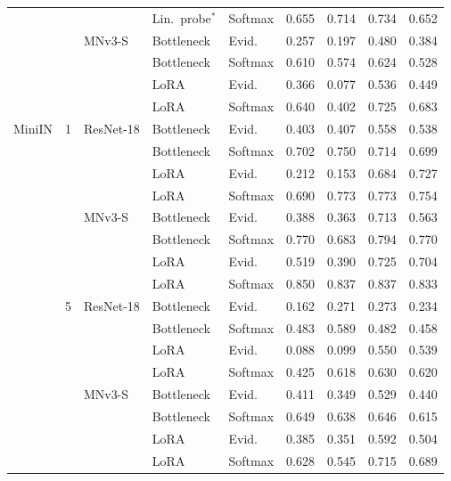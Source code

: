 \begin{longtable}{@{}lllllrrrr@{}}
 &  &  & Lin.\ probe$^\ast$ & Softmax & 0.655 & 0.714 & 0.734 & 0.652 \\
 &  & MNv3-S & Bottleneck & Evid. & 0.257 & 0.197 & 0.480 & 0.384 \\
 &  &  & Bottleneck & Softmax & 0.610 & 0.574 & 0.624 & 0.528 \\
 &  &  & LoRA & Evid. & 0.366 & 0.077 & 0.536 & 0.449 \\
 &  &  & LoRA & Softmax & 0.640 & 0.402 & 0.725 & 0.683 \\
MiniIN & 1 & ResNet-18 & Bottleneck & Evid. & 0.403 & 0.407 & 0.558 & 0.538 \\
 &  &  & Bottleneck & Softmax & 0.702 & 0.750 & 0.714 & 0.699 \\
 &  &  & LoRA & Evid. & 0.212 & 0.153 & 0.684 & 0.727 \\
 &  &  & LoRA & Softmax & 0.690 & 0.773 & 0.773 & 0.754 \\
 &  & MNv3-S & Bottleneck & Evid. & 0.388 & 0.363 & 0.713 & 0.563 \\
 &  &  & Bottleneck & Softmax & 0.770 & 0.683 & 0.794 & 0.770 \\
 &  &  & LoRA & Evid. & 0.519 & 0.390 & 0.725 & 0.704 \\
 &  &  & LoRA & Softmax & 0.850 & 0.837 & 0.837 & 0.833 \\
 & 5 & ResNet-18 & Bottleneck & Evid. & 0.162 & 0.271 & 0.273 & 0.234 \\
 &  &  & Bottleneck & Softmax & 0.483 & 0.589 & 0.482 & 0.458 \\
 &  &  & LoRA & Evid. & 0.088 & 0.099 & 0.550 & 0.539 \\
 &  &  & LoRA & Softmax & 0.425 & 0.618 & 0.630 & 0.620 \\
 &  & MNv3-S & Bottleneck & Evid. & 0.411 & 0.349 & 0.529 & 0.440 \\
 &  &  & Bottleneck & Softmax & 0.649 & 0.638 & 0.646 & 0.615 \\
 &  &  & LoRA & Evid. & 0.385 & 0.351 & 0.592 & 0.504 \\
 &  &  & LoRA & Softmax & 0.628 & 0.545 & 0.715 & 0.689 \\
\end{longtable}
\endgroup


